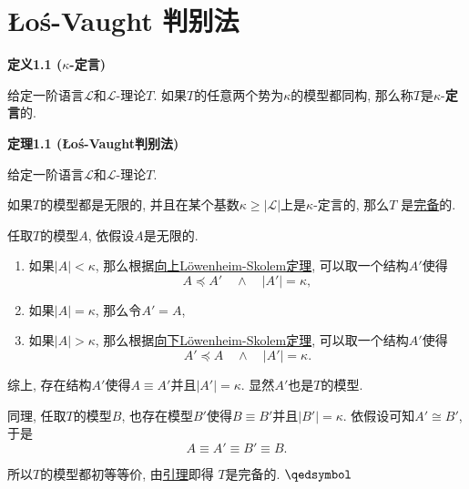 


\setlength{\abovedisplayskip}{1pt}
\setlength{\belowdisplayskip}{1pt}

\section{Łoś-Vaught 判别法}

\hypertarget{sec:定义1.1}{}
\noindent\textbf{定义1.1 ($\kappa$-定言)}

给定一阶语言$\mathcal{L}$和$\mathcal{L}$-理论$T$.
如果$T$的任意两个势为$\kappa$的模型都同构, 那么称$T$是$\kappa$-\textbf{定言}的.

\vspace{10pt}

\hypertarget{sec:定理1.1}{}
\noindent\textbf{定理1.1 (Łoś-Vaught判别法)}

给定一阶语言$\mathcal{L}$和$\mathcal{L}$-理论$T$.

如果$T$的模型都是无限的,
并且在某个基数$\kappa\geqslant|\mathcal{L}|$上是$\kappa$-定言的, 那么$T$
是\href{../02 一阶语义/03 一阶理论与模型#nameddest=sec:定义2.1}{完备}的.


任取$T$的模型$A$, 依假设$A$是无限的.
\begin{enumerate}
    \item 如果$|A|<\kappa$,
    那么根据\href{03 Löwenheim-Skolem 定理#nameddest=sec:定理2.1}
    {向上Löwenheim-Skolem定理}, 可以取一个结构$A'$使得
    \[
        A\preccurlyeq A'\quad\land\quad|A'|=\kappa,
    \]
    \item 如果$|A|=\kappa$, 那么令$A'=A$,
    \item 如果$|A|>\kappa$,
    那么根据\href{03 Löwenheim-Skolem 定理#nameddest=sec:定理1.1}
    {向下Löwenheim-Skolem定理}, 可以取一个结构$A'$使得
    \[
        A'\preccurlyeq A\quad\land\quad|A'|=\kappa.
    \]
\end{enumerate}

综上, 存在结构$A'$使得$A\equiv A'$并且$|A'|=\kappa$. 显然$A'$也是$T$的模型.

同理, 任取$T$的模型$B$, 也存在模型$B'$使得$B\equiv B'$并且$|B'|=\kappa$.
依假设可知$A'\cong B'$, 于是
\[
    A\equiv A'\equiv B'\equiv B.
\]


所以$T$的模型都初等等价,
由\href{../02 一阶语义/03 一阶理论与模型#nameddest=sec:定理2.1}{引理}即得
$T$是完备的. \hfill $\qedsymbol$

